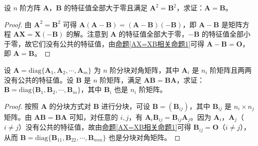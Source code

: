 \documentclass[../../main.tex]{subfiles}%
\begin{document}
\begin{example}\label{example:分块准对角阵的块之间两两没有公共特征值则与其可交换的矩阵也有同样分块}
设 \(n\) 阶方阵 \(\boldsymbol{A}\)，\(\boldsymbol{B}\) 的特征值全部大于零且满足 \(\boldsymbol{A}^2 = \boldsymbol{B}^2\)，求证：\(\boldsymbol{A} = \boldsymbol{B}\)。
\end{example}
\begin{proof}

由 \(\boldsymbol{A}^2 = \boldsymbol{B}^2\) 可得 \(\boldsymbol{A}(\boldsymbol{A - B}) = (\boldsymbol{A - B})(-\boldsymbol{B})\)，即 \(\boldsymbol{A - B}\) 是矩阵方程 \(\boldsymbol{AX = X(-B)}\) 的解。注意到 \(\boldsymbol{A}\) 的特征值全部大于零，\(-\boldsymbol{B}\) 的特征值全部小于零，故它们没有公共的特征值，由\hyperref[AX=XB相关命题1]{命题\ref{AX=XB相关命题1}}可得 \(\boldsymbol{A - B} = \boldsymbol{O}\)，即 \(\boldsymbol{A} = \boldsymbol{B}\)。

\end{proof}

\begin{example}
设 \(\boldsymbol{A} = \mathrm{diag}\{\boldsymbol{A}_1,\boldsymbol{A}_2,\cdots,\boldsymbol{A}_m\}\) 为 \(n\) 阶分块对角矩阵，其中 \(\boldsymbol{A}_i\) 是 \(n_i\) 阶矩阵且两两没有公共的特征值。设 \(\boldsymbol{B}\) 是 \(n\) 阶矩阵，满足 \(\boldsymbol{AB = BA}\)，求证：\(\boldsymbol{B} = \mathrm{diag}\{\boldsymbol{B}_1,\boldsymbol{B}_2,\cdots,\boldsymbol{B}_m\}\)，其中 \(\boldsymbol{B}_i\) 也是 \(n_i\) 阶矩阵。
\end{example}
\begin{proof}

按照 \(\boldsymbol{A}\) 的分块方式对 \(\boldsymbol{B}\) 进行分块，可设 \(\boldsymbol{B} = (\boldsymbol{B}_{ij})\)，其中 \(\boldsymbol{B}_{ij}\) 是 \(n_i\times n_j\) 矩阵。由 \(\boldsymbol{AB = BA}\) 可知，对任意的 \(i,j\)，有 \(\boldsymbol{A}_i\boldsymbol{B}_{ij} = \boldsymbol{B}_{ij}\boldsymbol{A}_j\)。因为 \(\boldsymbol{A}_i\)，\(\boldsymbol{A}_j\)（\(i\neq j\)）没有公共的特征值，故由\hyperref[AX=XB相关命题1]{命题\ref{AX=XB相关命题1}}可得 \(\boldsymbol{B}_{ij} = \boldsymbol{O}\)（\(i\neq j\)），从而 \(\boldsymbol{B} = \mathrm{diag}\{\boldsymbol{B}_{11},\boldsymbol{B}_{22},\cdots,\boldsymbol{B}_{mm}\}\) 也是分块对角矩阵。

\end{proof}
\end{document}
